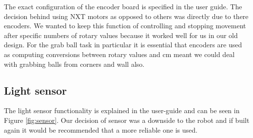 \documentclass[a4paper,12pt]{article}
\begin{document}
The exact configuration of the encoder board is specified in the user guide. The decision behind using NXT motors as opposed to others was directly due to there encoders. We wanted to keep this function of controlling and stopping movement after specific numbers of rotary values because it worked well for us in our old design. For the grab ball task in particular it is essential that encoders are used as computing conversions between rotary values and cm meant we could deal with grabbing balls from corners and wall also. 

\subsection{Light sensor}

The light sensor functionality is explained in the user-guide and can be seen in Figure \ref{fig:sensor}. Our decision of sensor was a downside to the robot and if built again it would be recommended that a more reliable one is used.
\end{document}
